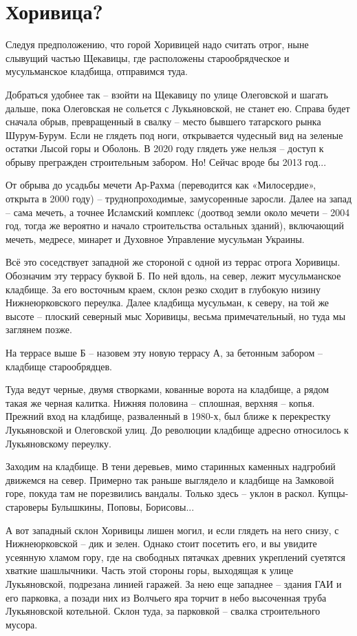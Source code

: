 \chapter{Хоривица?}

Следуя предположению, что горой Хоривицей надо считать отрог, ныне слывущий частью Щекавицы, где расположены старообрядческое и мусульманское кладбища, отправимся туда. 

Добраться удобнее так – взойти на Щекавицу по улице Олеговской и шагать дальше, пока Олеговская не сольется с Лукьяновской, не станет ею. Справа будет сначала обрыв, превращенный в свалку – место бывшего татарского рынка Шурум-Бурум. Если не глядеть под ноги, открывается чудесный вид на зеленые остатки Лысой горы и Оболонь. В 2020 году глядеть уже нельзя – доступ к обрыву прегражден строительным забором. Но! Сейчас вроде бы 2013 год...

От обрыва до усадьбы мечети Ар-Рахма (переводится как «Милосердие», открыта в 2000 году) – труднопроходимые, замусоренные заросли. Далее на запад – сама мечеть, а точнее Исламский комплекс (доотвод земли около мечети – 2004 год, тогда же вероятно и начало строительства остальных зданий), включающий мечеть, медресе, минарет и Духовное Управление мусульман Украины.

Всё это соседствует западной же стороной с одной из террас отрога Хоривицы. Обозначим эту террасу буквой Б. По ней вдоль, на север, лежит мусульманское кладбище. За его восточным краем, склон резко сходит в глубокую низину Нижнеюрковского переулка. Далее кладбища мусульман, к северу, на той же высоте – плоский северный мыс Хоривицы, весьма примечательный, но туда мы заглянем позже.

На террасе выше Б – назовем эту новую террасу А, за бетонным забором – кладбище старообрядцев.

Туда ведут черные, двумя створками, кованные ворота на кладбище, а рядом такая же черная калитка. Нижняя половина – сплошная, верхняя – копья. Прежний вход на кладбище, разваленный в 1980-х, был ближе к перекрестку Лукьяновской и Олеговской улиц. До революции кладбище адресно относилось к Лукьяновскому переулку.

Заходим на кладбище. В тени деревьев, мимо старинных каменных надгробий движемся на север. Примерно так раньше выглядело и кладбище на Замковой горе, покуда там не порезвились вандалы. Только здесь – уклон в раскол. Купцы-староверы Булышкины, Поповы, Борисовы...

А вот западный склон Хоривицы лишен могил, и если глядеть на него снизу, с Нижнеюрковской – дик и зелен. Однако стоит посетить его, и вы увидите усеянную хламом гору, где на свободных пятачках древних укреплений суетятся хваткие шашлычники. Часть этой стороны горы, выходящая к улице Лукьяновской, подрезана линией гаражей. За нею еще западнее – здания ГАИ и его парковка, а позади них из Волчьего яра торчит в небо высоченная труба Лукьяновской котельной. Склон туда, за парковкой – свалка строительного мусора.

